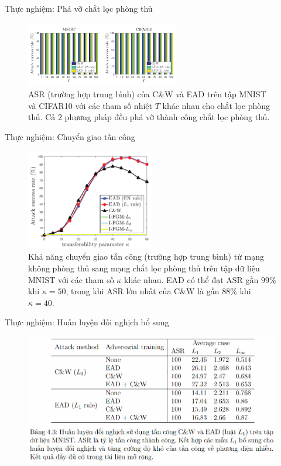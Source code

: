 \begin{frame}{Thực nghiệm: Phá vỡ chắt lọc phòng thủ}
    \begin{figure}[H] %
        \centering %
        \includegraphics[width=0.6\textwidth]{images/fig_3.png} 
        \caption{ASR (trường hợp trung bình) của C\&W và EAD trên tập MNIST và CIFAR10 với các tham số nhiệt $T$ khác nhau cho chắt lọc phòng thủ. Cả 2 phương pháp đều phá vỡ thành công chắt lọc phòng thủ.} %
        \label{fig:fg_03}
    \end{figure}
\end{frame}

\begin{frame}{Thực nghiệm: Chuyển giao tấn công}
    \begin{figure}[H] %
        \centering %
        \includegraphics[width=0.5\textwidth]{images/fig_04.png} 
        \caption{Khả năng chuyển giao tấn công (trường hợp trung bình) từ mạng không phòng thủ sang mạng chắt lọc phòng thủ  trên tập dữ liệu MNIST với các tham số $\kappa$ khác nhau. EAD có thể đạt ASR gần $99\%$ khi $\kappa = 50$, trong khi ASR lớn nhất của C\&W là gần $88\%$ khi $\kappa=40$.} %
        \label{fig:fg_04}
    \end{figure}
\end{frame}

\begin{frame}{Thực nghiệm: Huấn luyện đối nghịch bổ sung}
    \begin{figure}
        \centering
        \includegraphics[scale=0.55]{images/tab_4_3.png}
    \end{figure}
\end{frame}

